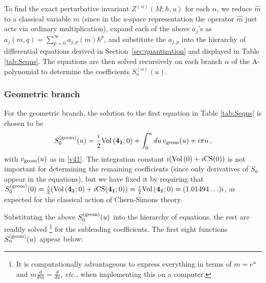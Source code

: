 \documentclass[hyper]{JHEP3}
\newcommand\be{\begin{equation}}
\newcommand\ee{\end{equation}}
\newcommand{\Vol}{{\mbox{Vol\,}}}
\begin{document}
To find the exact perturbative invariant $Z^{(\alpha)} (M;\hbar,u)$ for each $\alpha$,
we reduce $\hat{m}$ to a classical variable $m$ (since in the $u$-space representation
the operator $\hat{m}$ just acts via ordinary multiplication),
expand each of the above $a_j$'s as $a_j(m,q) = \sum_{p=0}^\infty a_{j,p}(m)\hbar^p$,
and substitute the $a_{j,p}$ into the hierarchy of differential equations derived
in Section~\ref{sec:quantization} and displayed in Table \ref{tab:Seqns}.
The equations are then solved recursively on each branch $\alpha$
of the A-polynomial to determine the coefficients $S_n^{(\alpha)}(u)$.


\subsubsection*{Geometric branch}

For the geometric branch,
the solution to the first equation in Table \ref{tab:Seqns} is chosen to be
\be
S_0^{({\rm geom})} (u) = \frac{i}{2}\Vol({\bf 4_1};0) + \int_0^u du\, v_{{\rm geom}} (u) + i\pi u\,,
\label{GS0}
\ee
with $v_{{\rm geom}} (u)$ as in \eqref{v41}.
The integration constant $i(\Vol(0)+i\rm{CS}(0))$ is not important for determining the remaining coefficients
(since only derivatives of $S_0$ appear in the equations), but we have fixed it by requiring that
$S_0^{({\rm geom})}(0) = \frac{i}{2}(\Vol({\bf 4_1};0)+i {\rm CS} ({\bf 4_1};0))
= \frac{i}{2}\Vol({\bf 4_1};0) = (1.01494\ldots)i$,
as expected for the classical action of Chern-Simons theory.

Substituting the above $S_0^{({\rm geom})} (u)$
into the hierarchy of equations, the rest are readily solved%
%
\footnote{It is computationally advantageous to express everything in terms of $m=e^u$
and $m \frac{d}{dm}=\frac{d}{du}$, {\it etc.}, when implementing this on a computer.} %
%
for the subleading coefficients. The first eight functions $S_n^{({\rm geom})}(u)$ appear below:

\underline{\hspace{2in}}
\end{document}
